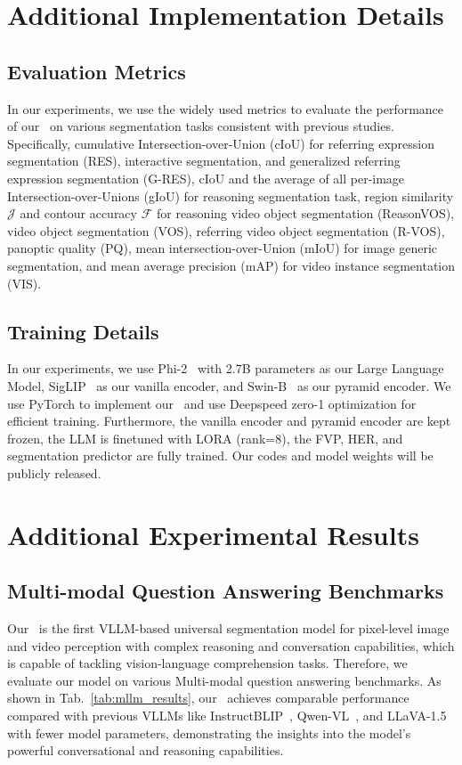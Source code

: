 \section{Additional Implementation Details}
\label{sec:implement_details}

\subsection{Evaluation Metrics}

In our experiments, we use the widely used metrics to evaluate the performance of our \name~on various segmentation tasks consistent with previous studies. Specifically, cumulative Intersection-over-Union (cIoU) for referring expression segmentation (RES), interactive segmentation, and generalized referring expression segmentation (G-RES), cIoU and the average of all per-image Intersection-over-Unions (gIoU) for reasoning segmentation task, region similarity $\mathcal{J}$ and contour accuracy $\mathcal{F}$ for reasoning video object segmentation (ReasonVOS), video object segmentation (VOS), referring video object segmentation (R-VOS), panoptic quality (PQ), mean intersection-over-Union (mIoU) for image generic segmentation, and mean average precision (mAP) for video instance segmentation (VIS).

\subsection{Training Details}
In our experiments, we use Phi-2~\cite{javaheripi2023phi} with 2.7B parameters as our Large Language Model,  SigLIP~\cite{zhai2023sigmoid} as our vanilla encoder, and Swin-B~\cite{liu2021swin} as our pyramid encoder.
We use PyTorch to implement our \name~and use Deepspeed zero-1 optimization for efficient training. 
Furthermore, the vanilla encoder and pyramid encoder are kept frozen, the LLM is finetuned with LORA (rank=8), the FVP, HER, and segmentation predictor are fully trained. Our codes and model weights will be publicly released.

\section{Additional Experimental Results}

\subsection{Multi-modal Question Answering Benchmarks}
Our \name~is the first VLLM-based universal segmentation model for pixel-level image and video perception with complex reasoning and conversation capabilities, which is capable of tackling vision-language comprehension tasks. 
Therefore, we evaluate our model on various Multi-modal question answering benchmarks. 
As shown in Tab.~\ref{tab:mllm_results}, our \name~achieves comparable performance compared with previous VLLMs like 
InstructBLIP~\cite{instructblip}, Qwen-VL~\cite{bai2023qwen}, and LLaVA-1.5~\cite{liu2024visual} with fewer model parameters, demonstrating the insights into the model’s powerful conversational and reasoning capabilities.

